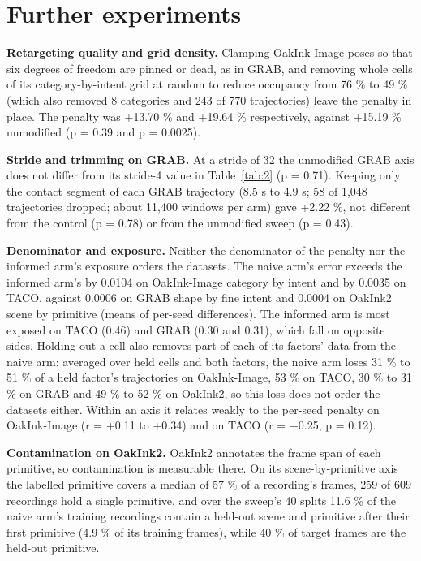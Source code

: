 \documentclass[10pt]{article}
\begin{document}
\section{Further experiments}

\textbf{Retargeting quality and grid density.} Clamping OakInk-Image poses so that six degrees of freedom are pinned or dead, as in GRAB, and removing whole cells of its category-by-intent grid at random to reduce occupancy from 76 \% to 49 \% (which also removed 8 categories and 243 of 770 trajectories) leave the penalty in place. The penalty was +13.70 \% and +19.64 \% respectively, against +15.19 \% unmodified (p = 0.39 and p = 0.0025).

\textbf{Stride and trimming on GRAB.} At a stride of 32 the unmodified GRAB axis does not differ from its stride-4 value in Table~\ref{tab:2} (p = 0.71). Keeping only the contact segment of each GRAB trajectory (8.5 s to 4.9 s; 58 of 1,048 trajectories dropped; about 11,400 windows per arm) gave +2.22 \%, not different from the control (p = 0.78) or from the unmodified sweep (p = 0.43).

\textbf{Denominator and exposure.} Neither the denominator of the penalty nor the informed arm's exposure orders the datasets. The naive arm's error exceeds the informed arm's by 0.0104 on OakInk-Image category by intent and by 0.0035 on TACO, against 0.0006 on GRAB shape by fine intent and 0.0004 on OakInk2 scene by primitive (means of per-seed differences). The informed arm is most exposed on TACO (0.46) and GRAB (0.30 and 0.31), which fall on opposite sides. Holding out a cell also removes part of each of its factors' data from the naive arm: averaged over held cells and both factors, the naive arm loses 31 \% to 51 \% of a held factor's trajectories on OakInk-Image, 53 \% on TACO, 30 \% to 31 \% on GRAB and 49 \% to 52 \% on OakInk2, so this loss does not order the datasets either. Within an axis it relates weakly to the per-seed penalty on OakInk-Image (r = +0.11 to +0.34) and on TACO (r = +0.25, p = 0.12).

\textbf{Contamination on OakInk2.} OakInk2 annotates the frame span of each primitive, so contamination is measurable there. On its scene-by-primitive axis the labelled primitive covers a median of 57 \% of a recording's frames, 259 of 609 recordings hold a single primitive, and over the sweep's 40 splits 11.6 \% of the naive arm's training recordings contain a held-out scene and primitive after their first primitive (4.9 \% of its training frames), while 40 \% of target frames are the held-out primitive.
\end{document}
